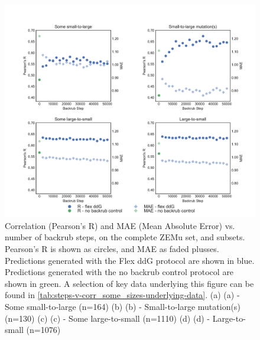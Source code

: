 \begin{figure}
  \includegraphics[width=\textwidth,keepaspectratio]{steps-v-corr_some_sizes.pdf}
  \caption[Flex ddG performance vs. number of backrub steps]{
    Correlation (Pearson's R) and MAE (Mean Absolute Error) vs. number of backrub steps, on the complete ZEMu set, and subsets.
    Pearson's R is shown as circles, and MAE as faded plusses.
Predictions generated with the Flex ddG protocol are shown in blue.
Predictions generated with the no backrub control protocol are shown in green.
    A selection of key data underlying this figure can be found in \cref{tab:steps-v-corr_some_sizes-underlying-data}.
    (a) (a) - Some small-to-large (n=164)
    (b) (b) - Small-to-large mutation(s) (n=130)
    (c) (c) - Some large-to-small (n=1110)
    (d) (d) - Large-to-small (n=1076)
  } \label{fig:steps-v-corr_some_sizes}
\end{figure}
